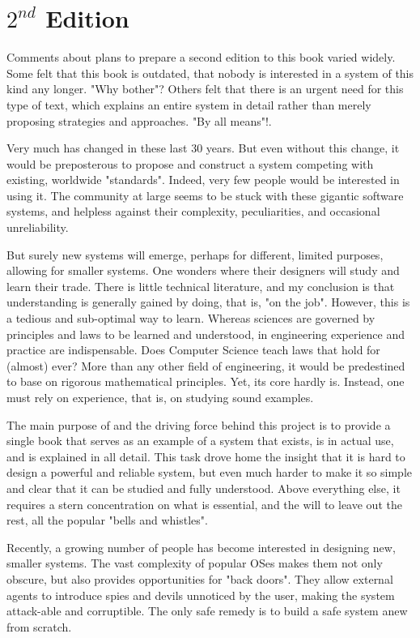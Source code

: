 \clearpage\section{$2^{nd}$ Edition}
Comments about plans to prepare a second edition to this book varied widely. Some felt that this
book is outdated, that nobody is interested in a system of this kind any longer. "Why bother"?
Others felt that there is an urgent need for this type of text, which explains an entire system in detail
rather than merely proposing strategies and approaches. "By all means"!.

Very much has changed in these last 30 years. But even without this change, it would be
preposterous to propose and construct a system competing with existing, worldwide "standards".
Indeed, very few people would be interested in using it. The community at large seems to be stuck
with these gigantic software systems, and helpless against their complexity, peculiarities, and occasional unreliability.

But surely new systems will emerge, perhaps for different, limited purposes, allowing for smaller
systems. One wonders where their designers will study and learn their trade. There is little technical
literature, and my conclusion is that understanding is generally gained by doing, that is, "on the
job". However, this is a tedious and sub-optimal way to learn. Whereas sciences are governed by
principles and laws to be learned and understood, in engineering experience and practice are
indispensable. Does Computer Science teach laws that hold for (almost) ever? More than any other
field of engineering, it would be predestined to base on rigorous mathematical principles. Yet,
its core hardly is. Instead, one must rely on experience, that is, on studying sound examples.

The main purpose of and the driving force behind this project is to provide a single book that serves
as an example of a system that exists, is in actual use, and is explained in all detail. This task drove
home the insight that it is hard to design a powerful and reliable system, but even much harder to
make it so simple and clear that it can be studied and fully understood. Above everything else, it
requires a stern concentration on what is essential, and the will to leave out the rest, all the popular
"bells and whistles".

Recently, a growing number of people has become interested in designing new, smaller systems.
The vast complexity of popular OSes makes them not only obscure, but also provides
opportunities for "back doors". They allow external agents to introduce spies and devils unnoticed
by the user, making the system attack-able and corruptible. The only safe remedy is to build a safe
system anew from scratch.

